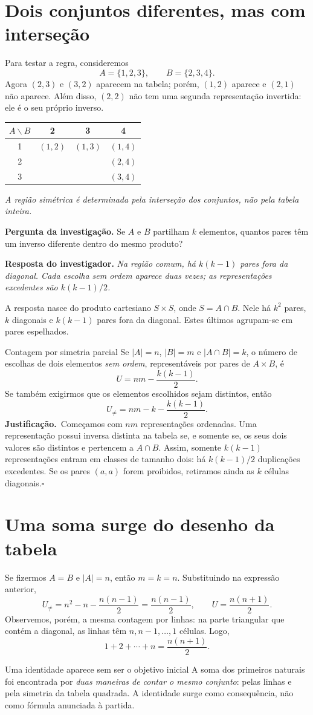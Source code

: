 \documentclass[11pt,a4paper,oneside]{book}
\newcommand{\Pergunta}[1]{\begin{perguntabox}\textbf{Pergunta da investigação.} #1\end{perguntabox}}
\newcommand{\Resposta}[1]{\textcolor{verdeescuro}{\textbf{Resposta do investigador.}} \emph{#1}\par}
\newcommand{\prova}{\textbf{Justificação.}\ }
\newcommand{\fimprova}{\hfill$\square$}
\newcommand{\card}[1]{\lvert #1\rvert}
\newcommand{\ccel}[1]{\cellcolor{green!13}{#1}}
\newcommand{\dc}[1]{\cellcolor{blue!12}{#1}}
\begin{document}
\section{Dois conjuntos diferentes, mas com interseção}
Para testar a regra, consideremos
\[A=\{1,2,3\},\qquad B=\{2,3,4\}.\]
Agora $(2,3)$ e $(3,2)$ aparecem na tabela; porém, $(1,2)$ aparece e $(2,1)$ não aparece. Além disso, $(2,2)$ não tem uma segunda representação invertida: ele é o seu próprio inverso.
\begin{center}\small
\begin{tabular}{c|ccc}
$A\backslash B$&2&3&4\\\hline
1&$(1,2)$&$(1,3)$&$(1,4)$\\
2&\dc{$(2,2)$}&\ccel{$(2,3)$}&$(2,4)$\\
3&\ccel{$(3,2)$}&\dc{$(3,3)$}&$(3,4)$
\end{tabular}
\end{center}
\emph{A região simétrica é determinada pela interseção dos conjuntos, não pela tabela inteira.}
\Pergunta{Se $A$ e $B$ partilham $k$ elementos, quantos pares têm um inverso diferente dentro do mesmo produto?}
\Resposta{Na região comum, há $k(k-1)$ pares fora da diagonal. Cada escolha sem ordem aparece duas vezes; as representações excedentes são $k(k-1)/2$.}
A resposta nasce do produto cartesiano $S\times S$, onde $S=A\cap B$. Nele há $k^2$ pares, $k$ diagonais e $k(k-1)$ pares fora da diagonal. Estes últimos agrupam-se em pares espelhados.
\begin{teoremabox}{Contagem por simetria parcial}
Se $\card A=n$, $\card B=m$ e $\card{A\cap B}=k$, o número de escolhas de dois elementos \emph{sem ordem}, representáveis por pares de $A\times B$, é
\[U=nm-\frac{k(k-1)}2.\]
Se também exigirmos que os elementos escolhidos sejam distintos, então
\[U_{\ne}=nm-k-\frac{k(k-1)}2.\]
\prova Começamos com $nm$ representações ordenadas. Uma representação possui inversa distinta na tabela se, e somente se, os seus dois valores são distintos e pertencem a $A\cap B$. Assim, somente $k(k-1)$ representações entram em classes de tamanho dois: há $k(k-1)/2$ duplicações excedentes. Se os pares $(a,a)$ forem proibidos, retiramos ainda as $k$ células diagonais.\fimprova
\end{teoremabox}
\section{Uma soma surge do desenho da tabela}
Se fizermos $A=B$ e $\card A=n$, então $m=k=n$. Substituindo na expressão anterior,
\[
U_{\ne}=n^2-n-\frac{n(n-1)}2=\frac{n(n-1)}2,
\qquad
U=\frac{n(n+1)}2.
\]
Observemos, porém, a mesma contagem por linhas: na parte triangular que contém a diagonal, as linhas têm $n,n-1,\ldots,1$ células. Logo,
\[
1+2+\cdots+n=\frac{n(n+1)}2.
\]
\begin{descobertabox}{Uma identidade aparece sem ser o objetivo inicial}
A soma dos primeiros naturais foi encontrada por \emph{duas maneiras de contar o mesmo conjunto}: pelas linhas e pela simetria da tabela quadrada. A identidade surge como consequência, não como fórmula anunciada à partida.
\end{descobertabox}
\end{document}
